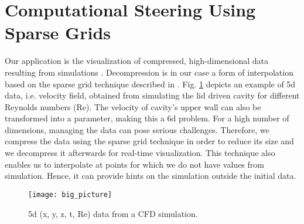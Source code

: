 \section{Computational Steering Using Sparse Grids}

Our application is
 the visualization of compressed, high-dimensional data resulting from simulations \cite{butnaru2011}. Decompression is in our case a form of interpolation based on the sparse grid technique described in \cite{bungartz2004}. 
Fig. \ref{fig:big_picture} depicts an example of 5d data, i.e. velocity field, obtained from simulating the lid driven cavity for different  Reynolds numbers (Re). 
The velocity of cavity's upper wall can also be transformed into a parameter, making this a 6d problem. For a high number of dimensions, managing the data can pose serious challenges. Therefore, we compress the data using the sparse grid technique in order to reduce its size and we decompress it afterwards for real-time visualization. 
This technique also enables us to interpolate at points for which we do not have values from simulation. Hence, it can provide hints on the simulation outside the initial data.

\begin{figure}[bp]
  \centering
  \texttt{[image: big\_picture]}
  \caption{5d (x, y, z, t, Re) data from a CFD simulation.}
  \label{fig:big_picture}
\end{figure}

